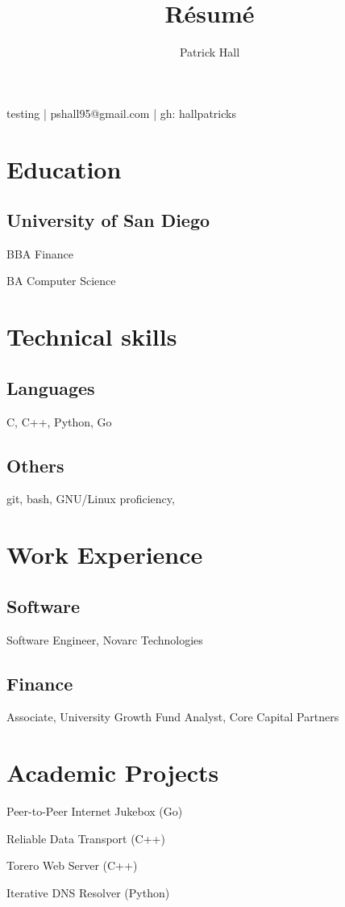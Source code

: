 \documentclass{article}
\makeatletter
\renewcommand{\maketitle}{
\begin{center}
{\huge\bfseries
\theauthor}

testing | pshall95@gmail.com | gh: hallpatricks

\end{center}
}
\makeatother
\begin{document}
\title{R\'esum\'e}
\author{Patrick Hall}

\maketitle

\section{Education}
\subsection{University of San Diego}
BBA Finance

BA Computer Science

\section{Technical skills}
\subsection{Languages}
C, C++, Python, Go

\subsection{Others}
git, bash, GNU/Linux proficiency, 

\section{Work Experience}
\subsection{Software}
Software Engineer, Novarc Technologies

\subsection{Finance}
Associate, University Growth Fund
Analyst, Core Capital Partners

\section{Academic Projects}
Peer-to-Peer Internet Jukebox (Go)

Reliable Data Transport (C++)

Torero Web Server (C++)

Iterative DNS Resolver (Python)
\end{document}
